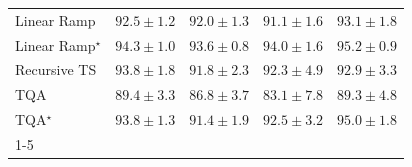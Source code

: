 \begin{tabular}{l|cccc|}
Linear Ramp & {\cellcolor[HTML]{045585}} \color[HTML]{F1F1F1} $92.5\pm 1.2$ & {\cellcolor[HTML]{04588A}} \color[HTML]{F1F1F1} $92.0\pm 1.3$ & {\cellcolor[HTML]{045C90}} \color[HTML]{F1F1F1} $91.1\pm 1.6$ & {\cellcolor[HTML]{045280}} \color[HTML]{F1F1F1} $93.1\pm 1.8$ \\
Linear Ramp$^\star$ & {\cellcolor[HTML]{034A74}} \color[HTML]{F1F1F1} $94.3\pm 1.0$ & {\cellcolor[HTML]{034E7B}} \color[HTML]{F1F1F1} $93.6\pm 0.8$ & {\cellcolor[HTML]{034C78}} \color[HTML]{F1F1F1} $94.0\pm 1.6$ & {\cellcolor[HTML]{03456C}} \color[HTML]{F1F1F1} $95.2\pm 0.9$ \\
Recursive TS & {\cellcolor[HTML]{034D79}} \color[HTML]{F1F1F1} $93.8\pm 1.8$ & {\cellcolor[HTML]{04598C}} \color[HTML]{F1F1F1} $91.8\pm 2.3$ & {\cellcolor[HTML]{045687}} \color[HTML]{F1F1F1} $92.3\pm 4.9$ & {\cellcolor[HTML]{045382}} \color[HTML]{F1F1F1} $92.9\pm 3.3$ \\
TQA & {\cellcolor[HTML]{04639B}} \color[HTML]{F1F1F1} $89.4\pm 3.3$ & {\cellcolor[HTML]{056DAC}} \color[HTML]{F1F1F1} $86.8\pm 3.7$ & {\cellcolor[HTML]{2081B9}} \color[HTML]{F1F1F1} $83.1\pm 7.8$ & {\cellcolor[HTML]{04639B}} \color[HTML]{F1F1F1} $89.3\pm 4.8$ \\
TQA$^\star$ & {\cellcolor[HTML]{034D79}} \color[HTML]{F1F1F1} $93.8\pm 1.3$ & {\cellcolor[HTML]{045B8F}} \color[HTML]{F1F1F1} $91.4\pm 1.9$ & {\cellcolor[HTML]{045585}} \color[HTML]{F1F1F1} $92.5\pm 3.2$ & {\cellcolor[HTML]{03466E}} \color[HTML]{F1F1F1} $95.0\pm 1.8$ \\
\cline{1-5}
\bottomrule
\end{tabular}
